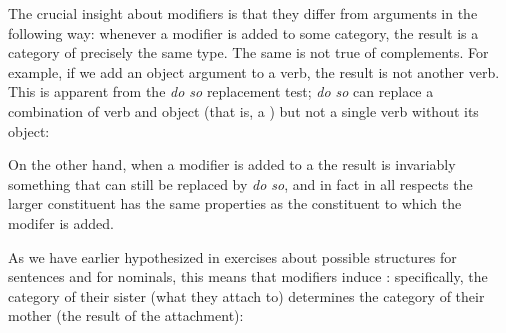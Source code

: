 \documentclass{article}
\begin{document}
The crucial insight about modifiers is that they differ from arguments in the following way: whenever a modifier is added to some category, the result is a category of precisely the same type.
The same is not true of complements. 
For example, if we add an object argument to a verb, the result is not another verb.
This is apparent from the \emph{do so} replacement test; \emph{do so} can replace a combination of verb and object (that is, a ) but not a single verb without its object:
\begin{exe}
    \label{complement_sub}
\end{exe}
On the other hand, when a modifier is added to a  the result is invariably something that can still be replaced by \emph{do so}, and in fact in all respects the larger constituent has the same properties as the constituent to which the modifer is added.
\begin{exe}
    \label{adjunct_sub}
\end{exe}
As we have earlier hypothesized in exercises about possible structures for sentences and for nominals, this means that modifiers induce :  specifically, the category of their sister (what they attach to) determines the category of their mother (the result of the attachment):
\begin{exe}
    \label{modifier_recursion}
\end{exe}
\end{document}
